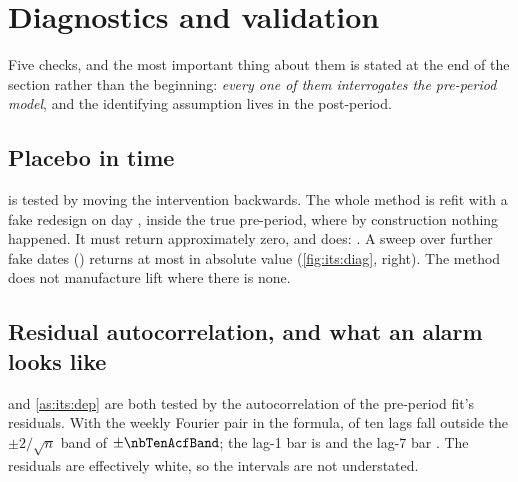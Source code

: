 

\section{Diagnostics and validation}
\label{sec:its:valid}

Five checks, and the most important thing about them is stated at the end of the section rather
than the beginning: \emph{every one of them interrogates the pre-period model}, and the
identifying assumption lives in the post-period.

\subsection*{Placebo in time}

 is tested by moving the intervention backwards. The whole method is refit with
a fake redesign on day \nbTenFakeDay, inside the true pre-period, where by construction nothing
happened. It must return approximately zero, and does: \pp{\nbTenPlacebo}. A sweep over further
fake dates (\nbTenPlaceboDates) returns at most \pp{\nbTenPlaceboMax} in absolute value
(\cref{fig:its:diag}, right). The method does not manufacture lift where there is none.

\subsection*{Residual autocorrelation, and what an alarm looks like}

 and \cref{as:its:dep} are both tested by the autocorrelation of the pre-period
fit's residuals. With the weekly Fourier pair in the formula, \nbTenAcfOut{} of ten lags fall
outside the $\pm 2/\sqrt{n}$ band of $\pm\nbTenAcfBand$; the lag-1 bar is \nbTenAcfOne{} and the
lag-7 bar \nbTenAcfSeven. The residuals are effectively white, so the intervals are not understated.

